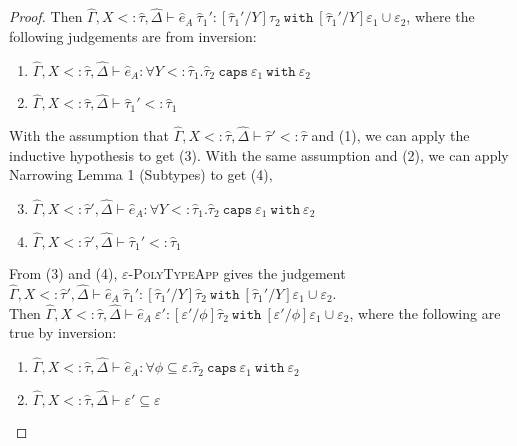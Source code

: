 \documentclass{llncs}
\newcommand{\keywadj}[1]{\mathtt{#1}}
\newcommand{\keyw}[1]{\keywadj{#1}~}
\newcommand{\kw}[1]{\keyw{ #1 }}
\begin{document}
\begin{proof}
 Then $\hat \Gamma, X <: \hat \tau, \hat \Delta \vdash \hat e_A~\hat \tau_1': [\hat \tau_1'/Y]\hat \tau_2~\kw{with} [\hat \tau_1'/Y]\varepsilon_1 \cup \varepsilon_2$, where the following judgements are from inversion:

\begin{enumerate}
	\item $\hat \Gamma, X<: \hat \tau, \hat \Delta \vdash \hat e_A: \forall Y <: \hat \tau_1. \hat \tau_2~\kw{caps} \varepsilon_1~\kw{with} \varepsilon_2$
	\item $\hat \Gamma, X <: \hat \tau, \hat \Delta \vdash \hat \tau_1' <: \hat \tau_1$
\end{enumerate}

With the assumption that $\hat \Gamma, X <: \hat \tau, \hat \Delta \vdash \hat \tau' <: \hat \tau$ and (1), we can apply the inductive hypothesis to get (3). With the same assumption and (2), we can apply Narrowing Lemma 1 (Subtypes) to get (4),

\begin{enumerate}
	\setcounter{enumi}{2}
	\item $\hat \Gamma, X <:  \hat \tau', \hat \Delta \vdash \hat e_A: \forall Y <: \hat \tau_1. \hat \tau_2~\kw{caps} \varepsilon_1~\kw{with} \varepsilon_2$
	\item $\hat \Gamma, X <: \hat \tau', \hat \Delta \vdash \hat \tau_1' <: \hat \tau_1$
\end{enumerate}

From (3) and (4), \textsc{$\varepsilon$-PolyTypeApp} gives the judgement $\hat \Gamma, X <: \hat \tau', \hat \Delta \vdash \hat e_A~\hat \tau_1': [\hat \tau_1'/Y]\hat \tau_2~\kw{with} [\hat \tau_1'/Y]\varepsilon_1 \cup \varepsilon_2$.\\

 Then $\hat \Gamma, X <: \hat \tau, \hat \Delta \vdash \hat e_A~\varepsilon': [\varepsilon'/\phi]\hat \tau_2~\kw{with} [\varepsilon'/\phi]\varepsilon_1 \cup \varepsilon_2$, where the following are true by inversion:

\begin{enumerate}
	\item $\hat \Gamma, X <: \hat \tau, \hat \Delta \vdash \hat e_A: \forall \phi \subseteq \varepsilon. \hat \tau_2~\kw{caps} \varepsilon_1~\kw{with} \varepsilon_2$
	\item $\hat \Gamma, X <: \hat \tau, \hat \Delta \vdash \varepsilon' \subseteq \varepsilon$
\end{enumerate}


\end{proof}
\end{document}
